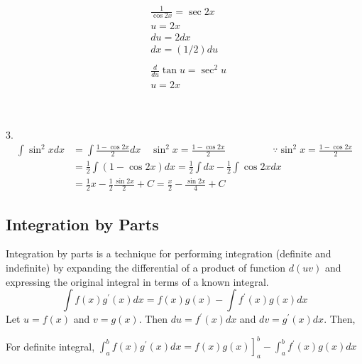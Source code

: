 \begin{answer}
\begin{minipage}{0.35\textwidth}
	\begin{align*}
	&\frac{1}{\cos 2 x}=\sec 2 x \\
	&u=2 x \\
	&d u=2 d x \\
	&d x=(1 / 2) d u \\
	\\
	&\frac{d}{d u} \tan u=\sec ^{2} u \\
	&u=2 x
\end{align*}
\end{minipage}\\\\
3.\vspace{0.2cm}\begin{align*}
\int \sin ^{2} x d x &=\int \frac{1-\cos 2 x}{2} d x \quad \sin ^{2} x=\frac{1-\cos 2 x}{2}\hspace{2cm} \because\sin ^{2} x=\frac{1-\cos 2 x}{2}\\
&=\frac{1}{2} \int(1-\cos 2 x) d x=\frac{1}{2} \int d x-\frac{1}{2} \int \cos 2 x d x \\
&=\frac{1}{2} x-\frac{1}{2} \frac{\sin 2 x}{2}+C=\frac{x}{2}-\frac{\sin 2 x}{4}+C
\end{align*}
\end{answer}
\subsection{Integration by Parts}
Integration by parts is a technique for performing integration (definite and indefinite) by expanding the differential of a product of function $d(u v)$ and expressing the original integral in terms of a known integral.
$$ \int f(x) g^{\prime}(x) d x=f(x) g(x)-\int f^{\prime}(x) g(x) d x$$
 Let $u=f(x)$ and $v=g(x)$. Then $d u=f^{\prime}(x) d x$ and $d v=g^{\prime}(x) d x$.
Then,
\begin{center}
\end{center}
\begin{note}\leavevmode \newline
For definite integral, $\left.\int_{a}^{b} f(x) g^{\prime}(x) d x=f(x) g(x)\right]_{a}^{b}-\int_{a}^{b} f^{\prime}(x) g(x) d x$
\end{note}
